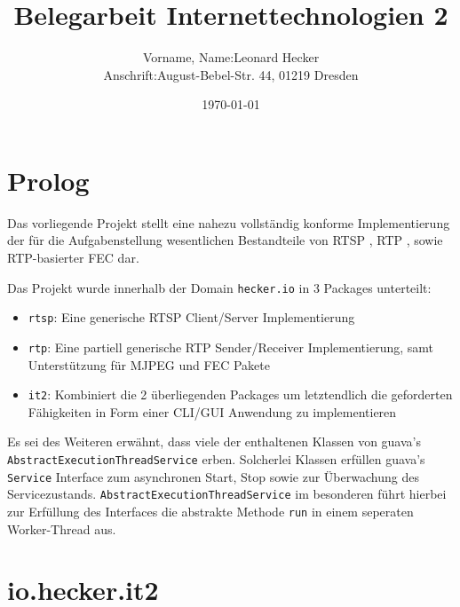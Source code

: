\documentclass[a4paper,12pt]{article}
\begin{document}
\sloppy

\title{Belegarbeit Internettechnologien 2}
\date{\footnotesize \today}
\author{
	\small
	\begin{tabular}{rl}
		Vorname, Name: & Leonard Hecker \\
		Anschrift:     & August-Bebel-Str. 44, 01219 Dresden \\
	\end{tabular}
}

\setcounter{page}{0}
\maketitle
\thispagestyle{empty}

\clearpage
\section{Prolog}

Das vorliegende Projekt stellt eine nahezu vollständig konforme Implementierung der für die Aufgabenstellung wesentlichen Bestandteile von RTSP \cite{RFC2326}, RTP \cite{RFC3550}, sowie RTP-basierter FEC \cite{RFC5109} dar.

Das Projekt wurde innerhalb der Domain \texttt{hecker.io} in 3 Packages unterteilt:
\vspace{-1.5\topsep}
\begin{itemize}
	\setlength{\itemsep}{0em}
	\item \texttt{rtsp}: Eine generische RTSP Client/Server Implementierung
	\item \texttt{rtp}: Eine partiell generische RTP Sender/Receiver Implementierung, samt Unterstützung für MJPEG und FEC Pakete
	\item \texttt{it2}: Kombiniert die 2 überliegenden Packages um letztendlich die geforderten Fähigkeiten in Form einer CLI/GUI Anwendung zu implementieren
\end{itemize}

Es sei des Weiteren erwähnt, dass viele der enthaltenen Klassen von guava's \texttt{AbstractExecutionThreadService} erben.
Solcherlei Klassen erfüllen guava's \texttt{Service} Interface zum asynchronen Start, Stop sowie zur Überwachung des Servicezustands.
\texttt{AbstractExecutionThreadService} im besonderen führt hierbei zur Erfüllung des Interfaces die abstrakte Methode \texttt{run} in einem seperaten Worker-Thread aus.

\clearpage
\section{io.hecker.it2}
\end{document}
